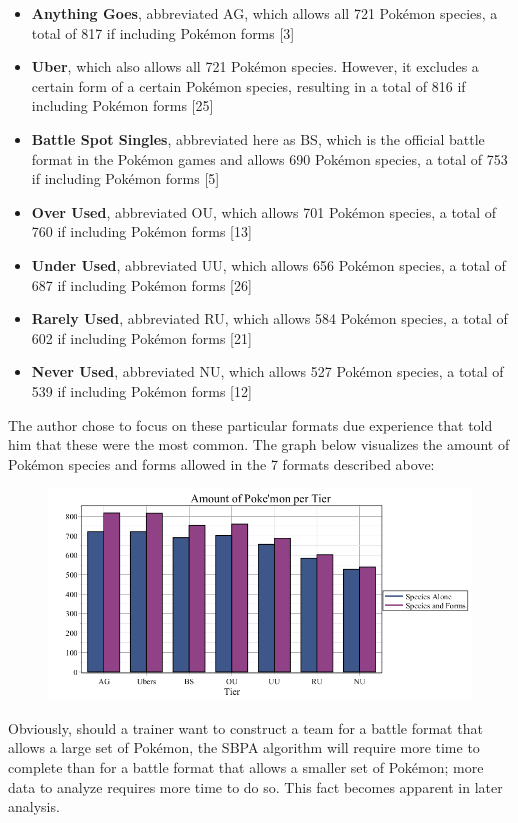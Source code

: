 \documentclass{article}
\begin{document}
\begin{itemize}
	\item \textbf{Anything Goes}, abbreviated AG, which allows all 721 Pok\'emon species, a total of 817 if including Pok\'emon forms [3]
	\item \textbf{Uber}, which also allows all 721 Pok\'emon species. However, it excludes a certain form of a certain Pok\'emon species, resulting in a total of 816 if including Pok\'emon forms [25]
	\item \textbf{Battle Spot Singles}, abbreviated here as BS, which is the official battle format in the Pok\'emon games and allows 690 Pok\'emon species, a total of 753 if including Pok\'emon forms [5]
	\item \textbf{Over Used}, abbreviated OU, which allows 701 Pok\'emon species, a total of 760 if including Pok\'emon forms [13]
	\item \textbf{Under Used}, abbreviated UU, which allows 656 Pok\'emon species, a total of 687 if including Pok\'emon forms [26]
	\item \textbf{Rarely Used}, abbreviated RU, which allows 584 Pok\'emon species, a total of 602 if including Pok\'emon forms [21]
	\item \textbf{Never Used}, abbreviated NU, which allows 527 Pok\'emon species, a total of 539 if including Pok\'emon forms [12]
\end{itemize}
The author chose to focus on these particular formats due experience that told him that these were the most common.
The graph below visualizes the amount of Pok\'emon species and forms allowed in the 7 formats described above:
\begin{figure}[H]
	\includegraphics[width=\textwidth]{TierAmount.png}
	\centering
	\caption{}\label{TierAmountGraph}
\end{figure}
Obviously, should a trainer want to construct a team for a battle format that allows a large set of Pok\'emon, the SBPA algorithm will require more time to complete than for a battle format that allows a smaller set of Pok\'emon; more data  to analyze requires more time to do so. This fact becomes apparent in later analysis.\\\\
\end{document}
